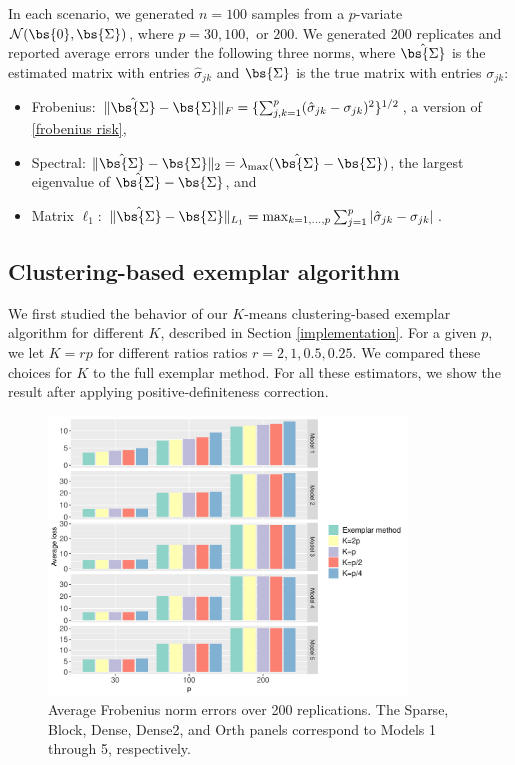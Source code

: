 In each scenario, we generated $n=100$ samples from a $p$-variate $\mathcal{N}(\bs{0}, \bs{\Sigma})$, where $p = 30, 100,$ or $200$. We generated $200$ replicates and reported average errors under the following three norms, where $\hat{\bs{\Sigma}}$ is the estimated matrix with entries $\hat{\sigma}_{jk}$ and $\bs{\Sigma}$ is the true matrix with entries $\sigma_{jk}$:
\begin{itemize}
\item Frobenius: $\Vert \hat{\bs{\Sigma}} - \bs{\Sigma} \Vert_F = \{ \sum_{j,k = 1}^p (\hat{\sigma}_{jk} - \sigma_{jk})^2 \}^{1/2}$, a version of \eqref{frobenius risk},
  
\item Spectral: $\Vert \hat{\bs{\Sigma}} - \bs{\Sigma} \Vert_2 = \lambda_{\max}(\hat{\bs{\Sigma}} - \bs{\Sigma})$, the largest eigenvalue of $\hat{\bs{\Sigma}} - \bs{\Sigma}$, and

\item Matrix $\ell_1$: $\Vert \hat{\bs{\Sigma}} - \bs{\Sigma} \Vert_{L_1} = \max_{k = 1, \ldots, p} \sum_{j = 1}^p \vert \hat{\sigma}_{jk} - \sigma_{jk} \vert$.
\end{itemize} 

\subsection{\label{optimalK}Clustering-based exemplar algorithm}
We first studied the behavior of our $K$-means clustering-based exemplar algorithm for different $K$, described in Section \ref{implementation}. For a given $p$, we let $K = rp$ for different ratios ratios $r=2,1,0.5,0.25$. We compared these choices for $K$ to the full exemplar method. For all these estimators, we show the result after applying positive-definiteness correction.

\begin{figure}
  \centering
  \includegraphics[width=0.85\textwidth]{img/sim1_frobenius.pdf}
  \caption{Average Frobenius norm errors over 200 replications. The Sparse, Block, Dense, Dense2, and Orth panels correspond to Models 1 through 5, respectively.}
  \label{fig:sim1_frobenius}
\end{figure}

